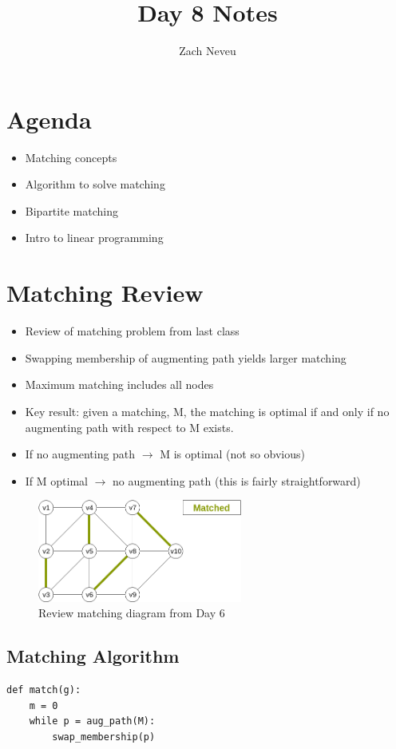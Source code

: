 \documentclass[12pt, letter]{article}
\author{Zach Neveu}
\title{ Day 8 Notes }
\begin{document}
\maketitle

\section{Agenda}%
\label{sec:agenda}
\begin{itemize}
	\item Matching concepts
	\item Algorithm to solve matching
	\item Bipartite matching
	\item Intro to linear programming
\end{itemize}

\section{Matching Review}%
\label{sec:matching_review}
\begin{itemize}
	\item Review of matching problem from last class
	\item Swapping membership of augmenting path yields larger matching
	\item Maximum matching includes all nodes
	\item Key result: given a matching, M, the matching is optimal if and only if no augmenting path with respect to M exists.
	\item If no augmenting path $\rightarrow$ M is optimal (not so obvious)
	\item If M optimal $\rightarrow$ no augmenting path (this is fairly straightforward)
\end{itemize}
\begin{figure}[h]
    \centering
    \includegraphics[width=0.6\textwidth]{matching}
    \caption{Review matching diagram from Day 6}
    \label{fig:matching}
\end{figure}

\subsection*{Matching Algorithm}
\begin{verbatim}
def match(g):
    m = 0
    while p = aug_path(M):
        swap_membership(p)
\end{verbatim}
\end{document}
